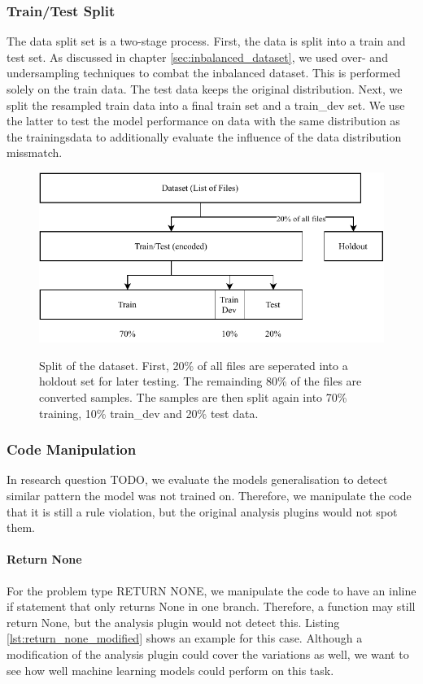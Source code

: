 \subsubsection{Train/Test Split}
The data split set is a two-stage process. 
First, the data is split into a train and test set. As discussed in chapter \ref{sec:inbalanced_dataset}, we used over- and undersampling techniques to combat the inbalanced dataset. This is performed solely on the train data. The test data keeps the original distribution. Next, we split the resampled train data into a final train set and a train\_dev set. We use the latter to test the model performance on data with the same distribution as the trainingsdata to additionally evaluate the influence of the data distribution missmatch.

\begin{figure}
    \includegraphics[width=1\textwidth]{img/ML/Data_split.pdf}
    \label{fig:data_split}
    \caption{Split of the dataset. First, 20\% of all files are seperated into a holdout set for later testing. The remainding 80\% of the files are converted samples. The samples are then split again into 70\% training, 10\% train\_dev and 20\% test data. }
\end{figure}

\subsubsection{Code Manipulation}
In research question TODO, we evaluate the models generalisation to detect similar pattern the model was not trained on. Therefore, we manipulate the code that it is still a rule violation, but the original analysis plugins would not spot them. 

\paragraph{Return None}\label{par:manipulation_return_none}
For the problem type RETURN NONE, we manipulate the code to have an inline if statement that only returns None in one branch. Therefore, a function may still return None, but the analysis plugin would not detect this. Listing \ref{lst:return_none_modified} shows an example for this case. Although a modification of the analysis plugin could cover the variations as well, we want to see how well machine learning models could perform on this task.

